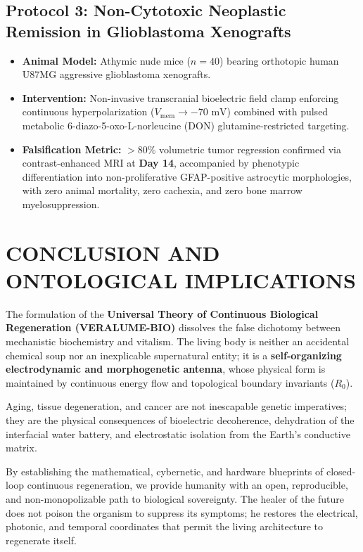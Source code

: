 \documentclass[10pt,twocolumn]{article}
\begin{document}
\subsection{Protocol 3: Non-Cytotoxic Neoplastic Remission in Glioblastoma Xenografts}
\begin{itemize}
  \item \textbf{Animal Model:} Athymic nude mice ($n=40$) bearing orthotopic human U87MG aggressive glioblastoma xenografts.
  \item \textbf{Intervention:} Non-invasive transcranial bioelectric field clamp enforcing continuous hyperpolarization ($V_{\text{mem}} \to -70\text{ mV}$) combined with pulsed metabolic 6-diazo-5-oxo-L-norleucine (DON) glutamine-restricted targeting.
  \item \textbf{Falsification Metric:} $> 80\%$ volumetric tumor regression confirmed via contrast-enhanced MRI at \textbf{Day 14}, accompanied by phenotypic differentiation into non-proliferative GFAP-positive astrocytic morphologies, with zero animal mortality, zero cachexia, and zero bone marrow myelosuppression.
\end{itemize}



\section{CONCLUSION AND ONTOLOGICAL IMPLICATIONS}

The formulation of the \textbf{Universal Theory of Continuous Biological Regeneration (VERALUME-BIO)} dissolves the false dichotomy between mechanistic biochemistry and vitalism. The living body is neither an accidental chemical soup nor an inexplicable supernatural entity; it is a \textbf{self-organizing electrodynamic and morphogenetic antenna}, whose physical form is maintained by continuous energy flow and topological boundary invariants ($R_0$).

Aging, tissue degeneration, and cancer are not inescapable genetic imperatives; they are the physical consequences of bioelectric decoherence, dehydration of the interfacial water battery, and electrostatic isolation from the Earth's conductive matrix.

By establishing the mathematical, cybernetic, and hardware blueprints of closed-loop continuous regeneration, we provide humanity with an open, reproducible, and non-monopolizable path to biological sovereignty. The healer of the future does not poison the organism to suppress its symptoms; he restores the electrical, photonic, and temporal coordinates that permit the living architecture to regenerate itself.
\end{document}
